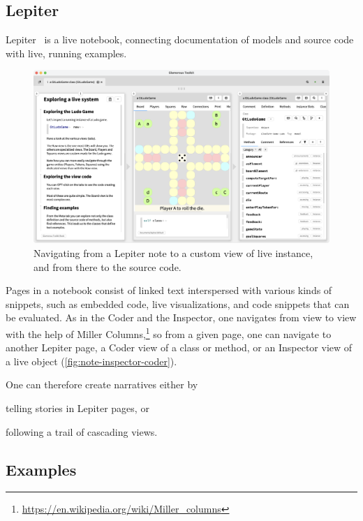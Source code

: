 \documentclass[conference]{IEEEtran}
\newcommand{\figlabel}[1]{\label{fig:#1}}
\begin{document}
\subsection{Lepiter}

Lepiter~\cite{Girb21a} is a live notebook, connecting documentation of models and source code with live, running examples.

\begin{figure}[htbp]
  \centering
  \includegraphics[width=\columnwidth]{figures/note-inspector-coder.png}
  \caption{Navigating from a Lepiter note to a custom view of live instance, and from there to the source code.}
  \figlabel{note-inspector-coder}
\end{figure}

Pages in a notebook consist of linked text interspersed with various kinds of snippets, such as embedded code, live visualizations, and code snippets that can be evaluated.
As in the Coder and the Inspector, one navigates from view to view with the help of Miller Columns,\footnote{\url{https://en.wikipedia.org/wiki/Miller_columns}} so from a given page, one can navigate to another Lepiter page, a Coder view of a class or method, or an Inspector view of a live object (\autoref{fig:note-inspector-coder}).

One can therefore create narratives either by
\begin{inparaenum}[(i)]
\item telling stories in Lepiter pages, or
\item following a trail of cascading views.
\end{inparaenum}

\subsection{Examples}
\end{document}
